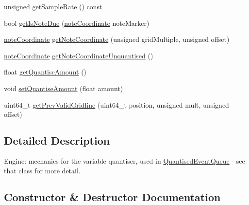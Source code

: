 \begin{DoxyCompactItemize}
\item 
unsigned \hyperlink{classQuantiseGrid__soft_a695d7d65a8c02e5bb86b0b218f8892c2}{get\+Sample\+Rate} () const 
\item 
bool \hyperlink{classQuantiseGrid__soft_a2401437abd3a1c44c536cf3a23d16fc6}{get\+Is\+Note\+Due} (\hyperlink{structQuantiseGrid__soft_1_1noteCoordinate}{note\+Coordinate} note\+Marker)
\item 
\hyperlink{structQuantiseGrid__soft_1_1noteCoordinate}{note\+Coordinate} \hyperlink{classQuantiseGrid__soft_a7831011191c8f3aae5bbe02105599b56}{get\+Note\+Coordinate} (unsigned grid\+Multiple, unsigned offset)
\item 
\hyperlink{structQuantiseGrid__soft_1_1noteCoordinate}{note\+Coordinate} \hyperlink{classQuantiseGrid__soft_af39e4b4597b5c9c88ee22ea0fccff0ea}{get\+Note\+Coordinate\+Unquantised} ()
\item 
float \hyperlink{classQuantiseGrid__soft_a405d013660b0e43f838f384810118e94}{get\+Quantise\+Amount} ()
\item 
void \hyperlink{classQuantiseGrid__soft_a229b51ec1d81751479eeb7e6418f092a}{set\+Quantise\+Amount} (float amount)
\item 
uint64\+\_\+t \hyperlink{classQuantiseGrid__soft_a41e868ae0c1092b300086eb3b6aa2506}{get\+Prev\+Valid\+Gridline} (uint64\+\_\+t position, unsigned mult, unsigned offset)
\end{DoxyCompactItemize}


\subsection{Detailed Description}
Engine\+: mechanics for the variable quantiser, used in \hyperlink{classQuantisedEventQueue}{Quantised\+Event\+Queue} -\/ see that class for more detail. 

\subsection{Constructor \& Destructor Documentation}
